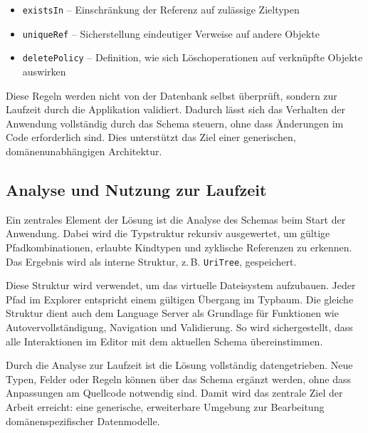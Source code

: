 \begin{itemize}
  \item \texttt{existsIn} – Einschränkung der Referenz auf zulässige Zieltypen
  \item \texttt{uniqueRef} – Sicherstellung eindeutiger Verweise auf andere Objekte
  \item \texttt{deletePolicy} – Definition, wie sich Löschoperationen auf verknüpfte Objekte auswirken
\end{itemize}

Diese Regeln werden nicht von der Datenbank selbst überprüft, sondern zur Laufzeit durch die Applikation validiert. Dadurch lässt sich das Verhalten der Anwendung vollständig durch das Schema steuern, ohne dass Änderungen im Code erforderlich sind. Dies unterstützt das Ziel einer generischen, domänenunabhängigen Architektur.

\subsection{Analyse und Nutzung zur Laufzeit}

Ein zentrales Element der Lösung ist die Analyse des Schemas beim Start der Anwendung. Dabei wird die Typstruktur rekursiv ausgewertet, um gültige Pfadkombinationen, erlaubte Kindtypen und zyklische Referenzen zu erkennen. Das Ergebnis wird als interne Struktur, z.\,B. \texttt{UriTree}, gespeichert.

Diese Struktur wird verwendet, um das virtuelle Dateisystem aufzubauen. Jeder Pfad im Explorer entspricht einem gültigen Übergang im Typbaum. Die gleiche Struktur dient auch dem Language Server als Grundlage für Funktionen wie Autovervollständigung, Navigation und Validierung. So wird sichergestellt, dass alle Interaktionen im Editor mit dem aktuellen Schema übereinstimmen.

Durch die Analyse zur Laufzeit ist die Lösung vollständig datengetrieben. Neue Typen, Felder oder Regeln können über das Schema ergänzt werden, ohne dass Anpassungen am Quellcode notwendig sind. Damit wird das zentrale Ziel der Arbeit erreicht: eine generische, erweiterbare Umgebung zur Bearbeitung domänenspezifischer Datenmodelle.
